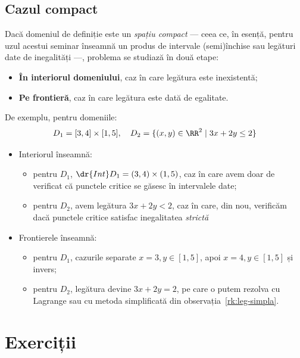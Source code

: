 
\subsection{Cazul compact}

Dacă domeniul de definiție este un \emph{spațiu compact} --- ceea ce, în esență,
pentru uzul acestui seminar înseamnă un produs de intervale (semi)închise
sau legături date de inegalități ---, problema se studiază în două etape:
\begin{itemize}
\item \textbf{În interiorul domeniului}, caz în care legătura este inexistentă;
\item \textbf{Pe frontieră}, caz în care legătura este dată de egalitate.
\end{itemize}

De exemplu, pentru domeniile:
\[
  D_1 = [3, 4] \times [1, 5], \quad D_2 = \{ (x, y) \in \RR^2 \mid 3x + 2y \leq 2 \}
\]
\begin{itemize}
\item Interiorul înseamnă:
  \begin{itemize}
  \item pentru $ D_1 $, $ \dr{Int}D_1 = (3, 4) \times (1, 5) $, caz în care avem
    doar de verificat că punctele critice se găsesc în intervalele date;
  \item pentru $ D_2 $, avem legătura $ 3x + 2y < 2 $, caz în care, din nou,
    verificăm dacă punctele critice satisfac inegalitatea \emph{strictă}
  \end{itemize}
\item Frontierele înseamnă:
  \begin{itemize}
  \item pentru $ D_1 $, cazurile separate $ x = 3, y \in [1, 5] $, apoi
    $ x = 4, y \in [1, 5] $ și invers;
  \item pentru $ D_2 $, legătura devine $ 3x + 2y = 2 $, pe care o putem rezolva
    cu Lagrange sau cu metoda simplificată din observația~\ref{rk:leg-simpla}.
  \end{itemize}
\end{itemize}


\section{Exerciții}

